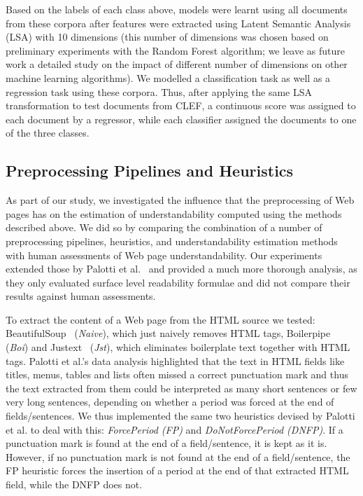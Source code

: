\documentclass[10pt,a4paper]{article}
\begin{document}
Based on the labels of each class above, models were learnt using all documents from these corpora after features were extracted using Latent Semantic Analysis (LSA) with 10 dimensions (this number of dimensions was chosen based on preliminary experiments with the Random Forest algorithm; we leave as future work a detailed study on the impact of different number of dimensions on other machine learning algorithms). We modelled a classification task as well as a regression task using these corpora. Thus, after applying the same LSA transformation to test documents from CLEF, a continuous score was assigned to each document by a regressor, while each classifier assigned the documents to one of the three classes. 


\subsection*{Preprocessing Pipelines and Heuristics}
\label{sec:pipelines}

As part of our study, we investigated the influence that the preprocessing of Web pages has on the estimation of understandability computed using the methods described above.
We did so by comparing the combination of a number of preprocessing pipelines, heuristics, and understandability estimation methods with human assessments of Web page understandability. 
Our experiments extended those by Palotti et al.~\cite{palotti15} and provided a much more thorough analysis, as they only evaluated surface level readability formulae and did not compare their results against human assessments. 

To extract the content of a Web page from the HTML source we tested: BeautifulSoup~\cite{bs4} (\textit{Naive}), which just naively removes HTML tags, Boilerpipe~\cite{kohlschutter10} (\textit{Boi}) and Justext~\cite{jan11} (\textit{Jst}), which eliminates boilerplate text together with HTML tags. 
Palotti et al.'s data analysis highlighted that the text in HTML fields like titles, menus, tables and lists often missed a correct punctuation mark and thus the text extracted from them could be interpreted as many short sentences or few very long sentences, depending on whether a period was forced at the end of fields/sentences. We thus implemented the same two heuristics devised by Palotti et al. to deal with this: \textit{ForcePeriod (FP)} and \textit{DoNotForcePeriod (DNFP)}. 
If a punctuation mark is found at the end of a field/sentence, it is kept as it is. However, if no punctuation mark is not found at the end of a field/sentence, the FP heuristic forces the insertion of a period at the end of that extracted HTML field, while the DNFP does not.
\end{document}
